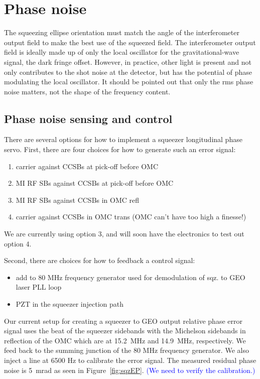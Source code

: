 \documentclass{ligodoc}
\begin{document}
\section{Phase noise}
The squeezing ellipse orientation must match the angle of the
interferometer output field to make the best use of the squeezed
field. The interferometer output field is ideally made up of only the
local oscillator for the gravitational-wave signal, the dark fringe
offset. However, in practice, other light is present and not only
contributes to the shot noise at the detector, but has the potential
of phase modulating the local oscillator. It should be pointed out
that only the rms phase noise matters, not the shape of the frequency
content.


\subsection{Phase noise sensing and control}
There are several options for how to implement a squeezer longitudinal
phase servo. First, there are four choices for how to generate such
an error signal:
\begin{enumerate}
\item carrier against CCSBs at pick-off before OMC
\item MI RF SBs against CCSBs at pick-off before OMC
\item MI RF SBs against CCSBs in OMC refl
\item carrier against CCSBs in OMC trans (OMC can't have too high a finesse!)
\end{enumerate}
We are currently using option 3, and will soon have the electronics to
test out option 4.

Second, there are choices for how to feedback a control signal:
\begin{itemize}
\item add to 80 MHz frequency generator used for demodulation of
  sqz. to GEO laser PLL loop
\item PZT in the squeezer injection path
\end{itemize}


Our current setup for creating a squeezer to GEO output relative phase
error signal uses the beat of the squeezer sidebands with the
Michelson sidebands in reflection of the OMC which are at 15.2~MHz and
14.9~MHz, respectively. We feed back to the summing junction of the 80
MHz frequency generator. We also inject a line at 6500 Hz to calibrate
the error signal. The measured residual phase noise is 5~mrad as seen
in Figure~\ref{fig:sqzEP}. \textcolor{blue}{(We need to verify the
  calibration.)}
\end{document}

